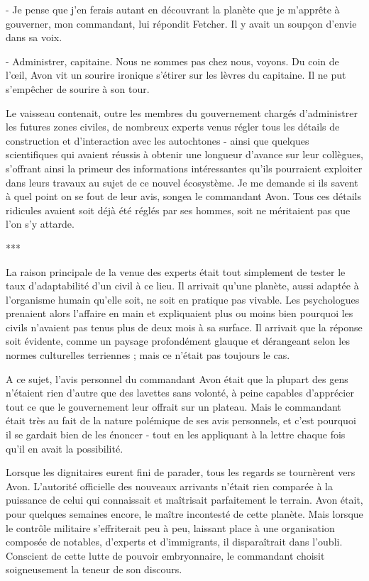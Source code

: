 \documentclass[12pt]{book}
\begin{document}
- Je pense que j'en ferais autant en découvrant la planète que je m'apprête à gouverner, mon commandant, lui répondit Fetcher. Il y avait un soupçon d'envie dans sa voix.

- Administrer, capitaine. Nous ne sommes pas chez nous, voyons. Du coin de l'œil, Avon vit un sourire ironique s'étirer sur les lèvres du capitaine. Il ne put s'empêcher de sourire à son tour.


Le vaisseau contenait, outre les membres du gouvernement chargés d'administrer les futures zones civiles, de nombreux experts venus régler tous les détails de construction et d'interaction avec les autochtones - ainsi que quelques scientifiques qui avaient réussis à obtenir une longueur d'avance sur leur collègues, s'offrant ainsi la primeur des informations intéressantes qu'ils pourraient exploiter dans leurs travaux au sujet de ce nouvel écosystème. Je me demande si ils savent à quel point on se fout de leur avis, songea le commandant Avon. Tous ces détails ridicules avaient soit déjà été réglés par ses hommes, soit ne méritaient pas que l'on s'y attarde.

***

La raison principale de la venue des experts était tout simplement de tester le taux d'adaptabilité d'un civil à ce lieu. Il arrivait qu'une planète, aussi adaptée à l'organisme humain qu'elle soit, ne soit en pratique pas vivable. Les psychologues prenaient alors l'affaire en main et expliquaient plus ou moins bien pourquoi les civils n'avaient pas tenus plus de deux mois à sa surface. Il arrivait que la réponse soit évidente, comme un paysage profondément glauque et dérangeant selon les normes culturelles terriennes ; mais ce n'était pas toujours le cas.


A ce sujet, l'avis personnel du commandant Avon était que la plupart des gens n'étaient rien d'autre que des lavettes sans volonté, à peine capables d'apprécier tout ce que le gouvernement leur offrait sur un plateau. Mais le commandant était très au fait de la nature polémique de ses avis personnels, et c'est pourquoi il se gardait bien de les énoncer - tout en les appliquant à la lettre chaque fois qu'il en avait la possibilité.


Lorsque les dignitaires eurent fini de parader, tous les regards se tournèrent vers Avon. L'autorité officielle des nouveaux arrivants n'était rien comparée à la puissance de celui qui connaissait et maîtrisait parfaitement le terrain. Avon était, pour quelques semaines encore, le maître incontesté de cette planète. Mais lorsque le contrôle militaire s'effriterait peu à peu, laissant place à une organisation composée de notables, d'experts et d'immigrants, il disparaîtrait dans l'oubli. Conscient de cette lutte de pouvoir embryonnaire, le commandant choisit soigneusement la teneur de son discours.
\end{document}
